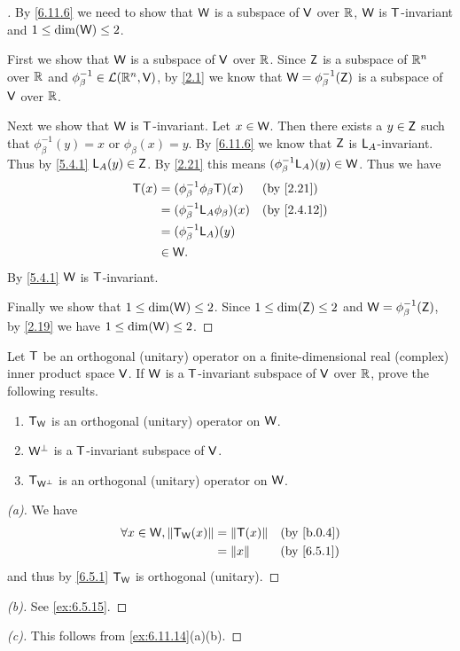 \begin{proof}[]
  By \cref{6.11.6} we need to show that \(\mathsf{W}\) is a subspace of \(\mathsf{V}\) over \(\mathbb{R}\), \(\mathsf{W}\) is \(\mathsf{T}\)-invariant and \(1 \leq \dim(\mathsf{W}) \leq 2\).

  First we show that \(\mathsf{W}\) is a subspace of \(\mathsf{V}\) over \(\mathbb{R}\).
  Since \(\mathsf{Z}\) is a subspace of \(\mathbb{R}^n\) over \(\mathbb{R}\) and \(\phi_{\beta}^{-1} \in \mathcal{L}(\mathbb{R}^n, \mathsf{V})\), by \cref{2.1} we know that \(\mathsf{W} = \phi_{\beta}^{-1}(\mathsf{Z})\) is a subspace of \(\mathsf{V}\) over \(\mathbb{R}\).

  Next we show that \(\mathsf{W}\) is \(\mathsf{T}\)-invariant.
  Let \(x \in \mathsf{W}\).
  Then there exists a \(y \in \mathsf{Z}\) such that \(\phi_{\beta}^{-1}(y) = x\) or \(\phi_{\beta}(x) = y\).
  By \cref{6.11.6} we know that \(\mathsf{Z}\) is \(\mathsf{L}_A\)-invariant.
  Thus by \cref{5.4.1} \(\mathsf{L}_A(y) \in \mathsf{Z}\).
  By \cref{2.21} this means \((\phi_{\beta}^{-1} \mathsf{L}_A)(y) \in \mathsf{W}\).
  Thus we have
  \begin{align*}
    \T(x) & = (\phi_{\beta}^{-1} \phi_{\beta} \T)(x)   &  & \by{2.21}   \\
          & = (\phi_{\beta}^{-1} \L_A \phi_{\beta})(x) &  & \by{2.4.12} \\
          & = (\phi_{\beta}^{-1} \L_A)(y)                               \\
          & \in \W.
  \end{align*}
  By \cref{5.4.1} \(\mathsf{W}\) is \(\mathsf{T}\)-invariant.

  Finally we show that \(1 \leq \dim(\mathsf{W}) \leq 2\).
  Since \(1 \leq \dim(\mathsf{Z}) \leq 2\) and \(\mathsf{W} = \phi_{\beta}^{-1}(\mathsf{Z})\), by \cref{2.19} we have \(1 \leq \dim(\mathsf{W}) \leq 2\).
\end{proof}

\begin{ex}\label{ex:6.11.14}
  Let \(\mathsf{T}\) be an orthogonal (unitary) operator on a finite-dimensional real (complex) inner product space \(\mathsf{V}\).
  If \(\mathsf{W}\) is a \(\mathsf{T}\)-invariant subspace of \(\mathsf{V}\) over \(\mathbb{R}\), prove the following results.
  \begin{enumerate}
    \item \(\mathsf{T}_{\mathsf{W}}\) is an orthogonal (unitary) operator on \(\mathsf{W}\).
    \item \(\mathsf{W}^{\perp}\) is a \(\mathsf{T}\)-invariant subspace of \(\mathsf{V}\).
    \item \(\mathsf{T}_{\mathsf{W}^{\perp}}\) is an orthogonal (unitary) operator on \(\mathsf{W}\).
  \end{enumerate}
\end{ex}

\begin{proof}[(a)]
  We have
  \begin{align*}
    \forall x \in \W, \norm{\T_{\W}(x)} & = \norm{\T(x)} &  & \by{b.0.4} \\
                                        & = \norm{x}     &  & \by{6.5.1}
  \end{align*}
  and thus by \cref{6.5.1} \(\mathsf{T}_{\mathsf{W}}\) is orthogonal (unitary).
\end{proof}

\begin{proof}[(b)]
  See \cref{ex:6.5.15}.
\end{proof}

\begin{proof}[(c)]
  This follows from \cref{ex:6.11.14}(a)(b).
\end{proof}
